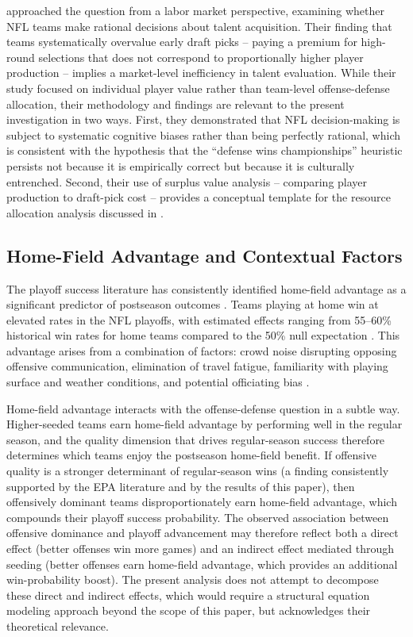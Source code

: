 \textcite{massey2013loserscurse} approached the question from a labor market perspective, examining whether NFL teams make rational decisions about talent acquisition. Their finding that teams systematically overvalue early draft picks  -- paying a premium for high-round selections that does not correspond to proportionally higher player production  -- implies a market-level inefficiency in talent evaluation. While their study focused on individual player value rather than team-level offense-defense allocation, their methodology and findings are relevant to the present investigation in two ways. First, they demonstrated that NFL decision-making is subject to systematic cognitive biases rather than being perfectly rational, which is consistent with the hypothesis that the ``defense wins championships'' heuristic persists not because it is empirically correct but because it is culturally entrenched. Second, their use of surplus value analysis  -- comparing player production to draft-pick cost  -- provides a conceptual template for the resource allocation analysis discussed in .

\subsection{Home-Field Advantage and Contextual Factors}
\label{sec:home-field}

The playoff success literature has consistently identified home-field advantage as a significant predictor of postseason outcomes \parencite{courneya1992home}. Teams playing at home win at elevated rates in the NFL playoffs, with estimated effects ranging from 55--60\% historical win rates for home teams compared to the 50\% null expectation \parencite{boulier2003predicting}. This advantage arises from a combination of factors: crowd noise disrupting opposing offensive communication, elimination of travel fatigue, familiarity with playing surface and weather conditions, and potential officiating bias \parencite{courneya1992home}.

Home-field advantage interacts with the offense-defense question in a subtle way. Higher-seeded teams earn home-field advantage by performing well in the regular season, and the quality dimension that drives regular-season success therefore determines which teams enjoy the postseason home-field benefit. If offensive quality is a stronger determinant of regular-season wins (a finding consistently supported by the EPA literature and by the results of this paper), then offensively dominant teams disproportionately earn home-field advantage, which compounds their playoff success probability. The observed association between offensive dominance and playoff advancement may therefore reflect both a direct effect (better offenses win more games) and an indirect effect mediated through seeding (better offenses earn home-field advantage, which provides an additional win-probability boost). The present analysis does not attempt to decompose these direct and indirect effects, which would require a structural equation modeling approach beyond the scope of this paper, but acknowledges their theoretical relevance.

